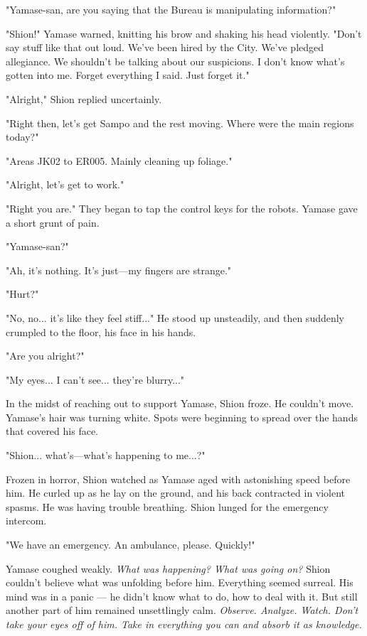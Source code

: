 "Yamase-san, are you saying that the Bureau is manipulating
information?"

"Shion!" Yamase warned, knitting his brow and shaking his head
violently. "Don't say stuff like that out loud. We've been hired by the
City. We've pledged allegiance. We shouldn't be talking about our
suspicions. I don't know what's gotten into me. Forget everything I
said. Just forget it."

"Alright," Shion replied uncertainly.

"Right then, let's get Sampo and the rest moving. Where were the main
regions today?"

"Areas JK02 to ER005. Mainly cleaning up foliage."

"Alright, let's get to work."

"Right you are." They began to tap the control keys for the robots.
Yamase gave a short grunt of pain.

"Yamase-san?"

"Ah, it's nothing. It's just---my fingers are strange."

"Hurt?"

"No, no... it's like they feel stiff..." He stood up unsteadily, and
then suddenly crumpled to the floor, his face in his hands.

"Are you alright?"

"My eyes... I can't see... they're blurry..."

In the midst of reaching out to support Yamase, Shion froze. He couldn't
move. Yamase's hair was turning white. Spots were beginning to spread
over the hands that covered his face.

"Shion... what's---what's happening to me...?"

Frozen in horror, Shion watched as Yamase aged with astonishing speed
before him. He curled up as he lay on the ground, and his back
contracted in violent spasms. He was having trouble breathing. Shion
lunged for the emergency intercom.

"We have an emergency. An ambulance, please. Quickly!"

Yamase coughed weakly. \emph{What was happening? What was going on?} Shion
couldn't believe what was unfolding before him. Everything seemed
surreal. His mind was in a panic --- he didn't know what to do, how to
deal with it. But still another part of him remained unsettlingly calm.
\emph{Observe. Analyze. Watch. Don't take your eyes off of him. Take in
everything you can and absorb it as knowledge.}

